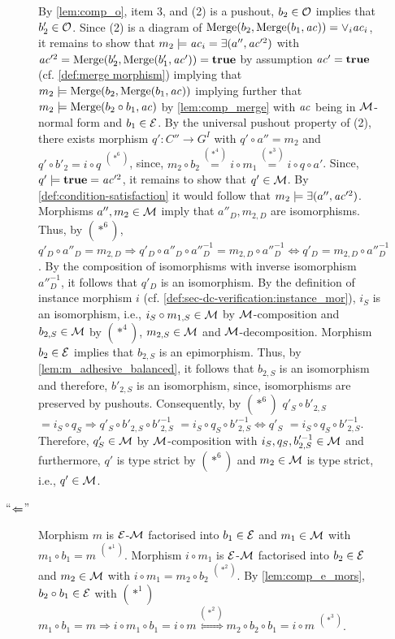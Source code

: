 \begin{description}
\begin{description}
By \cref{lem:comp_o}, item 3, and (2) is a pushout, $b_2 \in {\cal O}$ implies that $b'_2 \in {\cal O}$.
Since (2) is a diagram of $\mathrm{Merge}(b_2,\mathrm{Merge}(b_1,\mathit{ac}))=\vee_{i}\mathit{ac}_i$, it remains to show that $m_2 \models \mathit{ac}_i=\exists(a'', \mathit{ac}'^2)$ with $\mathit{ac}'^2=\mathrm{Merge}(b'_2,\mathrm{Merge}(b'_1,\mathit{ac}'))=\textbf{true}$ by assumption $\mathit{ac}'=\textbf{true}$ (cf. \cref{def:merge morphism}) implying that $m_2 \models \mathrm{Merge}(b_2,\mathrm{Merge}(b_1,\mathit{ac}))$ implying further that $m_2 \models \mathrm{Merge}(b_2 \circ b_1,\mathit{ac})$ by \cref{lem:comp_merge} with $\mathit{ac}$ being in ${\cal M}$-normal form and $b_1 \in \mathcal{E}$.
By the universal pushout property of (2), there exists morphism $q'\colon C'' \to G^I$ with $q' \circ a''=m_2$ and $q' \circ b'_2=i \circ q$ $^{(*^6)}$, since, $m_2 \circ b_2\stackrel{(*^4)}{=}i \circ m_1\stackrel{(*^3)}{=}i \circ q \circ a'$.
Since, $q' \models \textbf{true}=\mathit{ac}'^2$, it remains to show that $q' \in {\cal M}$.
By \cref{def:condition-satisfaction} it would follow that $m_2 \models \exists(a'',\mathit{ac}'^2)$.
Morphisms $a'',m_2 \in {\cal M}$ imply that $a''_D,m_{2,D}$ are isomorphisms.
Thus, by $(*^6)$, $q'_D \circ a''_D=m_{2,D} \Rightarrow q'_D \circ a''_D \circ a''^{-1}_D=m_{2,D} \circ a''^{-1}_D \Leftrightarrow q'_D=m_{2,D} \circ a''^{-1}_D$.
By the composition of isomorphisms with inverse isomorphism $a''^{-1}_D$, it follows that $q'_D$ is an isomorphism.
By the definition of instance morphism $i$ (cf. \cref{def:sec-dc-verification:instance_mor}), $i_S$ is an isomorphism, i.e., $i_S \circ m_{1,S} \in {\cal M}$ by ${\cal M}$-composition and $b_{2,S} \in {\cal M}$ by $(*^4)$, $m_{2,S} \in {\cal M}$ and ${\cal M}$-decomposition.
Morphism $b_{2} \in \mathcal{E}$ implies that $b_{2,S}$ is an epimorphism.
Thus, by \cref{lem:m_adhesive_balanced}, it follows that $b_{2,S}$ is an isomorphism and therefore, $b'_{2,S}$ is an isomorphism, since, isomorphisms are preserved by pushouts.
Consequently, by $(*^6)$ $q'_S \circ b'_{2,S}$ $=i_S \circ q_S \Rightarrow q'_S \circ b'_{2,S} \circ b'^{-1}_{2,S}$ $=i_S \circ q_S \circ b'^{-1}_{2,S} \Leftrightarrow q'_S$ $=i_S \circ q_S \circ b'^{-1}_{2,S}$.
Therefore, $q'_S \in {\cal M}$ by ${\cal M}$-composition with $i_S,q_S,b'^{-1}_{2,S} \in {\cal M}$ and furthermore, $q'$ is type strict by $(*^6)$ and $m_2 \in {\cal M}$ is type strict, i.e., $q' \in {\cal M}$.
\item[``$\TransB{}$''] Morphism $m$ is $\mathcal{E}$-${\cal M}$ factorised into $b_1 \in \mathcal{E}$ and $m_1 \in {\cal M}$ with $m_1 \circ b_1=m$ $^{(*^1)}$.
Morphism $i \circ m_1$ is $\mathcal{E}$-${\cal M}$ factorised into $b_2 \in \mathcal{E}$ and $m_2 \in {\cal M}$ with $i \circ m_1=m_2 \circ b_2$ $^{(*^2)}$.
By \cref{lem:comp_e_mors}, $b_2 \circ b_1 \in \mathcal{E}$ with $(*^1)$ $m_1 \circ b_1=m \Rightarrow i \circ m_1 \circ b_1=i \circ m \stackrel{(*^2)}{\Leftrightarrow} m_2 \circ b_2 \circ b_1=i\circ m$ $^{(*^3)}$.

\end{description}
\end{description}
